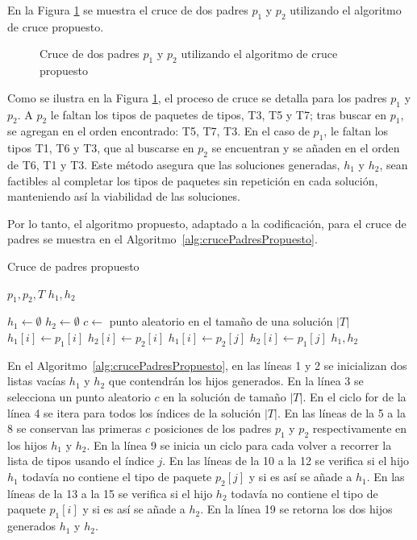 \documentclass[openany]{article}
\begin{document}
En la Figura \ref{fig:cruce_propuesto} se muestra el cruce de dos padres $p_1$ y $p_2$ utilizando el algoritmo de cruce propuesto.

\begin{figure}[H]
    \centering
    
    \caption{Cruce de dos padres $p_1$ y $p_2$ utilizando el algoritmo de cruce propuesto}
    \label{fig:cruce_propuesto}
\end{figure}

Como se ilustra en la Figura \ref{fig:cruce_propuesto}, el proceso de cruce se detalla para los padres $p_1$ y $p_2$. A $p_2$ le faltan los tipos de paquetes de tipos, T3, T5 y T7; tras buscar en $p_1$, se agregan en el orden encontrado: T5, T7, T3. En el caso de $p_1$, le faltan los tipos T1, T6 y T3, que al buscarse en $p_2$ se encuentran y se añaden en el orden de T6, T1 y T3. Este método asegura que las soluciones generadas, $h_1$ y $h_2$, sean factibles al completar los tipos de paquetes sin repetición en cada solución, manteniendo así la viabilidad de las soluciones.

Por lo tanto, el algoritmo propuesto, adaptado a la codificación, para el cruce de padres se muestra en el Algoritmo~\ref{alg:crucePadresPropuesto}.

\begin{algorithm}[H]
    \caption{Cruce de padres propuesto}\label{alg:crucePadresPropuesto}
    \begin{algorithmic}[1]
        \Require $p_1, p_2, T$
        \Ensure $h_1, h_2$

        \State $h_1 \leftarrow \emptyset$
        \State $h_2 \leftarrow \emptyset$
        \State $c \leftarrow$ punto aleatorio en el tamaño de una solución $|T|$
        \State $h_1[i] \leftarrow p_1[i]$
        \State $h_2[i] \leftarrow p_2[i]$
        \Else
        \State $h_1[i] \leftarrow p_2[j]$
        \EndIf
        \State $h_2[i] \leftarrow p_1[j]$
        \EndIf
        \EndFor
        \EndIf
        \EndFor
        \State \Return $h_1, h_2$
    \end{algorithmic}
\end{algorithm}

En el Algoritmo~\ref{alg:crucePadresPropuesto}, en las líneas 1 y 2 se inicializan dos listas vacías $h_1$ y $h_2$ que contendrán los hijos generados. En la línea 3 se selecciona un punto aleatorio $c$ en la solución de tamaño $|T|$. En el ciclo for de la línea 4 se itera para todos los índices de la solución $|T|$. En las líneas de la 5 a la 8 se conservan las primeras $c$ posiciones de los padres $p_1$ y $p_2$ respectivamente en los hijos $h_1$ y $h_2$. En la línea 9 se inicia un ciclo para cada volver a recorrer la lista de tipos usando el índice $j$. En las líneas de la 10 a la 12 se verifica si el hijo $h_1$ todavía no contiene el tipo de paquete $p_2[j]$ y si es así se añade a $h_1$. En las líneas de la 13 a la 15 se verifica si el hijo $h_2$ todavía no contiene el tipo de paquete $p_1[i]$ y si es así se añade a $h_2$. En la línea 19 se retorna los dos hijos generados $h_1$ y $h_2$.
\end{document}
